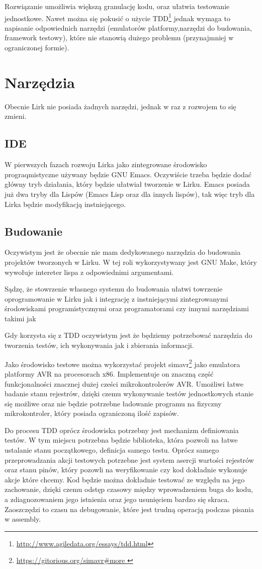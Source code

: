 \documentclass[11pt]{article}
\begin{document}
Rozwiązanie umożliwia większą granulację kodu, oraz ułatwia testowanie jednostkowe. Nawet można się pokusić o użycie TDD\footnote{\url{http://www.agiledata.org/essays/tdd.html}} jednak wymaga to napisanie odpowiednich narzędzi (emulatorów platformy,narzędzi do budowania, framework testowy), które nie stanowią dużego problemu (przynajmniej w ograniczonej formie).


\section{Narzędzia}
Obecnie Lirk nie posiada żadnych narzędzi, jednak w raz z rozwojem to się zmieni.
\subsection{IDE}
W pierwszych fazach rozwoju Lirka jako zintegrowane środowisko prograqmistyczne używany będzie GNU Emacs. 
Oczywiście trzeba będzie dodać główny tryb działania, który będzie ułatwiał tworzenie w Lirku.
Emacs posiada już dwa tryby dla Lispów (Emacs Lisp oraz dla innych lispów), tak więc tryb dla Lirka będzie modyfikacją instniejącego.
\subsection{Budowanie}
Oczywistym jest że obecnie nie mam dedykowanego narzędzia do budowania projektów tworzonych w  Lirku.
W tej roli wykorzystywany jest GNU Make, który wywołuje intereter lispa z odpowiednimi argumentami.

Sądzę, że stowrzenie własnego systemu do budowania ułatwi towrzenie oprogramowanie w Lirku 
jak i integrację z instniejącymi zintegrowanymi środowiskami programistycznymi oraz programatorami
czy innymi narzędziami takimi jak 

Gdy korzysta się z TDD oczywistym jest że będziemy potrzebować narzędzia do tworzenia testów, ich wykonywania jak i zbierania informacji.

Jako środowisko testowe można wykorzystać projekt simavr\footnote{ \url{ https://gitorious.org/simavr\#more }} jako emulatora platformy AVR na procesorach x86. 
Implementuje on znaczną część funkcjonalności znacznej dużej cześci mikrokontrolerów AVR.
Umożliwi łatwe badanie stanu rejestrów, dzięki czemu wykonywanie testów jednostkowych stanie się możliwe oraz
nie będzie potrzebne ładowanie programu na fizyczny mikrokontroler, który posiada ograniczoną ilość zapisów.

Do procesu TDD oprócz środowiska potrzebny jest mechanizm definiowania testów.
W tym miejscu potrzebna będzie biblioteka, która pozwoli na łatwe ustalanie stanu początkowego,
definicja samego testu.
Oprócz samego przeprowadzania akcji testowych potrzebne jest system asercji wartości rejestrów oraz stanu pinów,
który pozowli na weryfikowanie czy kod dokładnie wykonuje akcje które chcemy.
Kod będzie można dokładnie testować ze względu na jego zachowanie,
dzięki czemu odstęp czasowy między wprowadzeniem buga do kodu,
a zdiagnozowaniem jego istnienia oraz jego usunięciem bardzo się skraca.
Zaoszczędzi to czasu na debugowanie, które jest trudną operacją podczas pisania w assembly.
\end{document}
